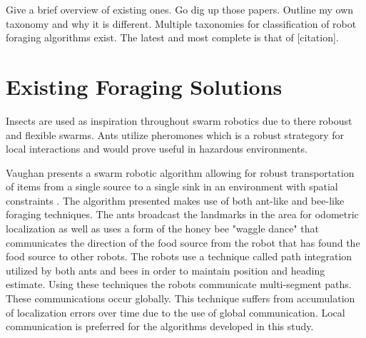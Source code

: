 Give a brief overview of existing ones. Go dig up those papers. 
Outline my own taxonomy and why it is different. Multiple taxonomies for classification of robot foraging algorithms exist. The latest and most complete is that of [citation].



\section{Existing Foraging Solutions}
\label{sec:second:existingsolution}



Insects are used as inspiration throughout swarm robotics due to there roboust and flexible swarms. Ants utilize pheromones which is a robust strategory for local interactions and would prove useful in hazardous environments. 

Vaughan presents a swarm robotic algorithm allowing for robust transportation of items from a single source to a single sink in an environment with spatial constraints \cite{vaughan2000blazing}. The algorithm presented makes use of both ant-like and bee-like foraging techniques. The ants broadcast the landmarks in the area for odometric localization as well as uses a form of the  honey bee "waggle dance" that communicates the direction of the food source from the robot that has found the food source to other robots. The robots use a technique called path integration utilized by both ants and bees in order to maintain position and heading estimate. Using these techniques the robots communicate multi-segment paths. These communications occur globally. This technique suffers from accumulation of localization errors over time due to the use of global communication. Local communication is preferred for the algorithms developed in this study.   %

